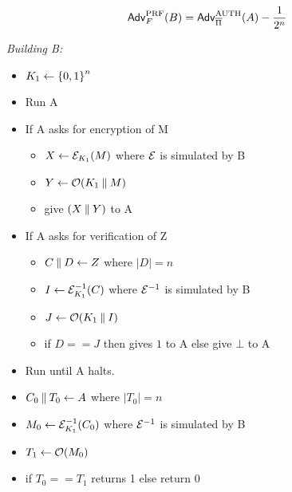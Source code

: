 \documentclass[11pt]{article}
\begin{document}
\begin{eqnarray*}
\mathsf{Adv}^{\mathrm{PRF}}_{F}{(B)} = \mathsf{Adv}^{\mathrm{AUTH}}_{\overline{\Pi}}{(A)} -  \frac{1}{2^n}
\end{eqnarray*}

\textit{Building B:}\\
\begin{itemize}
\item $K_1 \gets {\{0,1\}}^n$
\item Run A
\item If A asks for encryption of M
\begin{itemize}
\item $X \gets {\cal E}_{K_1}(M)$ where ${\cal E}$ is simulated by B
\item $Y \gets {\cal O}(K_1 \:\|\: M)$
\item give $(X \:\|\: Y)$ to A
\end{itemize}
\item If A asks for verification of Z
\begin{itemize}
\item $C \:\|\: D \gets Z$ where $|D|=n$
\item $I \gets {\cal E}^{-1}_{K_1}(C)$ where ${\cal E}^{-1}$ is simulated by B
\item $J \gets {\cal O}(K_1 \:\|\: I)$
\item if $D==J$ then gives $1$ to A else give $\bot$ to A
\end{itemize}
\item Run until A halts.
\item $C_0 \:\|\: T_0 \gets A$ where $|T_0|=n$
\item $M_0 \gets {\cal E}^{-1}_{K_1}(C_0)$ where ${\cal E}^{-1}$ is simulated by B
\item $T_1 \gets {\cal O}(M_0)$
\item if $T_0 == T_1$ returns 1 else return 0
\end{itemize}
\end{document}
